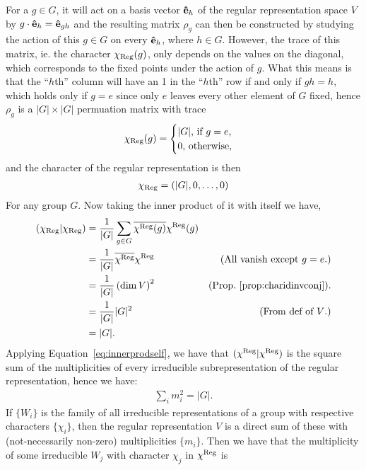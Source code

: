 For a $g \in G$, it will act on a basis vector $\mathbf{\hat{e}}_h$ of the regular representation space $V$ by $g \cdot \mathbf{\hat{e}}_{h} = \mathbf{\hat{e}}_{gh}$ and the resulting matrix $\rho_g$ can then be constructed by studying the action of this $g \in G$ on every $\mathbf{\hat{e}}_h$, where $h \in G$. However, the trace of this matrix, ie. the character $\chi_{\text{Reg}}(g)$, only depends on the values on the diagonal, which corresponds to the fixed points under the action of $g$. What this means is that the ``$h$th'' column will have an 1 in the ``$h$th'' row if and only if $gh = h$, which holds only if $g = e$ since only $e$ leaves every other element of $G$ fixed, hence $\rho_g$ is a $|G| \times |G|$ permuation matrix with trace
\begin{align}\label{eq:regcharacter}
	\chi_{\text{Reg}}(g) = \begin{cases}
		|G| \text{, if $g = e$,} \\
		0 \text{, otherwise,}
	\end{cases}
\end{align}
and the character of the regular representation is then
\begin{align*}
	\chi_{\text{Reg}} = (|G|, 0, \dots, 0)
\end{align*}
For any group $G$. Now taking the inner product of it with itself we have,
\begin{align*}
	(\chi_{\text{Reg}}|\chi_{\text{Reg}}) &= \frac{1}{|G|} \sum_{g \in G} \overline{\chi^{\text{Reg}}(g)}\chi^{\text{Reg}}(g) \\
	&=  \frac{1}{|G|}  \overline{\chi^{\text{Reg}}}\chi^{\text{Reg}} & \text{(All vanish except $g=e$.)} \\
	&= \frac{1}{|G|} \left(\dim V \right)^2  & \text{(Prop.~\ref{prop:charidinvconj}).}\\
	&= \frac{1}{|G|}|G|^2 & \text{(From def of $V$.)} \\
	&= |G|.
\end{align*}
Applying Equation~\ref{eq:innerprodself}, we have that $(\chi^{\text{Reg}}|\chi^{\text{Reg}}) $ is the square sum of the multiplicities of every irreducible subrepresentation of the regular representation, hence we have:
\begin{align}\label{eq:sqsummult}
	\sum_i m_i^2 = |G|.
\end{align}
If $\{W_i\}$ is the family of all irreducible representations of a group with respective characters $\{\chi_i\}$, then the regular representation $V$ is a direct sum of these with (not-necessarily non-zero) multiplicities $\{m_i\}$. Then we have that the multiplicity of some irreducible $W_j$ with character $\chi_j$ in $\chi^{\text{Reg}}$ is
